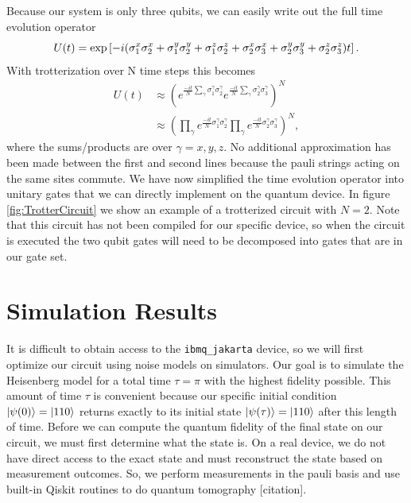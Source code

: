 \documentclass[aps,prl, reprint]{revtex4-2}
\begin{document}
Because our system is only three qubits, we can easily write out the full time evolution operator
\begin{dmath}
U(t) = \exp\left[-i(\sigma_{1}^{x} \sigma_{2}^{x} + \sigma_{1}^{y} \sigma_{2}^{y} + \sigma_{1}^{z} \sigma_{2}^{z} \\
+ \sigma_{2}^{x} \sigma_{3}^{x} + \sigma_{2}^{y} \sigma_{3}^{y} + \sigma_{2}^{z} \sigma_{3}^{z})t\right].
\end{dmath}
With trotterization over N time steps this becomes
\begin{align*}
U(t) &\approx \left(e^{\frac{-it}{N}\sum_\gamma\sigma_{1}^{\gamma} \sigma_{2}^{\gamma}}e^{\frac{-it}{N}\sum_\gamma\sigma_{2}^{\gamma} \sigma_{3}^{\gamma}}\right)^N\\
&\approx \left(\prod_{\gamma}e^{\frac{-it}{N}\sigma_{1}^{\gamma} \sigma_{2}^{\gamma}}\prod_{\gamma}e^{\frac{-it}{N}\sigma_{2}^{\gamma} \sigma_{3}^{\gamma}}\right)^N,
\end{align*}
where the sums/products are over $\gamma =x,y,z$. No additional approximation has been made between the first and second lines because the pauli strings acting on the same sites commute. We have now simplified the time evolution operator into unitary gates that we can directly implement on the quantum device. In figure \ref{fig:TrotterCircuit} we show an example of a trotterized circuit with $N=2$. Note that this circuit has not been compiled for our specific device, so when the circuit is executed the two qubit gates will need to be decomposed into gates that are in our gate set.

\section{Simulation Results}

It is difficult to obtain access to the \texttt{ibmq\_jakarta} device, so we will first optimize our circuit using noise models on simulators. Our goal is to simulate the Heisenberg model for a total time $\tau=\pi$ with the highest fidelity possible. This amount of time $\tau$ is convenient because our specific initial condition $\ket{\psi(0)}=\ket{110}$ returns exactly to its initial state $\ket{\psi(\tau)}=\ket{110}$ after this length of time. Before we can compute the quantum fidelity of the final state on our circuit, we must first determine what the state is. On a real device, we do not have direct access to the exact state and must reconstruct the state based on measurement outcomes. So, we perform measurements in the pauli basis and use built-in Qiskit routines to do quantum tomography [citation].
\end{document}
